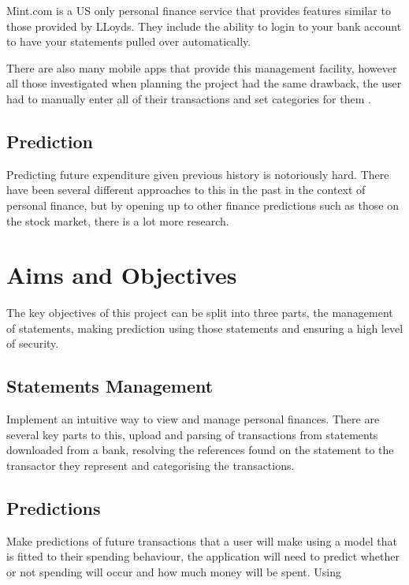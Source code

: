 Mint.com is a US only personal finance service that provides features similar to those provided by LLoyds. They include the ability to login to your bank account to have your statements pulled over automatically.

There are also many mobile apps that provide this management facility, however all those investigated when planning the project had the same drawback, the user had to manually enter all of their transactions and set categories for them \cite{spendee2014spendee,budgt2013budgt,bluetags2014pocket}.

\subsection{Prediction}

Predicting future expenditure given previous history is notoriously hard. There have been several different approaches to this in the past in the context of personal finance, but by opening up to other finance predictions such as those on the stock market, there is a lot more research.

\section{Aims and Objectives}

The key objectives of this project can be split into three parts, the management of statements, making prediction using those statements and ensuring a high level of security.

\subsection{Statements Management}
Implement an intuitive way to view and manage personal finances.
There are several key parts to this, upload and parsing of transactions from statements downloaded from a bank, resolving the references found on the statement to the transactor they represent and categorising the transactions.
    
\subsection{Predictions}
Make predictions of future transactions that a user will make using a model that is fitted to their spending behaviour, the application will need to predict whether or not spending will occur and how much money will be spent.
Using

